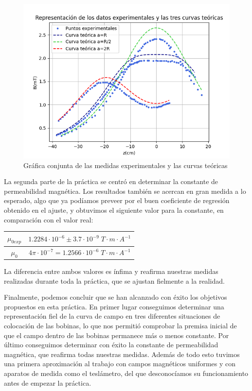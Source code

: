 \documentclass[a4paper,12pt,titlepage]{report}
\begin{document}
\begin{figure}[h!]
    \centering
    \includegraphics[width=0.95\linewidth]{Images/Tres curvas.png}
    \caption{Gráfica conjunta de las medidas experimentales y las curvas teóricas}
\end{figure}


La segunda parte de la práctica se centró en determinar la constante de permeabilidad magnética. Los resultados también se acercan en gran medida a lo esperado, algo que ya podíamos preveer por el buen coeficiente de regresión obtenido en el ajuste, y obtuvimos el siguiente valor para la constante, en comparación con el valor real:

\newpage

\begin{table}[h!]
    \centering
    \begin{tabular}{|c|c|}
        \hline
            $\mu_{0exp}$ & $1.2284 \cdot 10^{-6} \pm 3.7 \cdot 10^{-9} \; T \cdot m \cdot A^{-1}$ \\ \hline
            $\mu_0$ & $4\pi\cdot 10^{-7} = 1.2566 \cdot 10^{-6} \; T \cdot m \cdot A^{-1}$ \\ \hline
    \end{tabular}
\end{table}

La diferencia entre ambos valores es ínfima y reafirma nuestras medidas realizadas durante toda la práctica, que se ajustan fielmente a la realidad.

\par Finalmente, podemos concluir que se han alcanzado con éxito los objetivos propuestos en esta práctica. En primer lugar conseguimos determinar una representación fiel de la curva de campo en tres diferentes situaciones de colocación de las bobinas, lo que nos permitió comprobar la premisa inicial de que el campo dentro de las bobinas permanece más o menos constante. Por último conseguimos determinar con éxito la constante de permeabilidad magnética, que reafirma todas nuestras medidas. Además de todo esto tuvimos una primera aproximación al trabajo con campos magnéticos uniformes y con aparatos de medida como el teslámetro, del que desconocíamos su funcionamiento antes de empezar la práctica.
\end{document}

